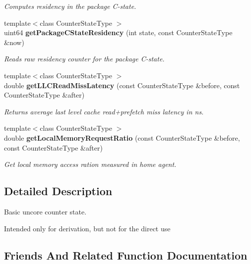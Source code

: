 \begin{DoxyCompactItemize}
\begin{DoxyCompactList}\small\item\em Computes residency in the package C-\/state. \end{DoxyCompactList}\item 
{\footnotesize template$<$class Counter\+State\+Type $>$ }\\uint64 \textbf{ get\+Package\+C\+State\+Residency} (int state, const Counter\+State\+Type \&now)
\begin{DoxyCompactList}\small\item\em Reads raw residency counter for the package C-\/state. \end{DoxyCompactList}\item 
\mbox{\label{classUncoreCounterState_a6791e3fe842320171cbac393e55929f6}} 
{\footnotesize template$<$class Counter\+State\+Type $>$ }\\double \textbf{ get\+L\+L\+C\+Read\+Miss\+Latency} (const Counter\+State\+Type \&before, const Counter\+State\+Type \&after)
\begin{DoxyCompactList}\small\item\em Returns average last level cache read+prefetch miss latency in ns. \end{DoxyCompactList}\item 
{\footnotesize template$<$class Counter\+State\+Type $>$ }\\double \textbf{ get\+Local\+Memory\+Request\+Ratio} (const Counter\+State\+Type \&before, const Counter\+State\+Type \&after)
\begin{DoxyCompactList}\small\item\em Get local memory access ration measured in home agent. \end{DoxyCompactList}\end{DoxyCompactItemize}


\subsection{Detailed Description}
Basic uncore counter state. 

Intended only for derivation, but not for the direct use 

\subsection{Friends And Related Function Documentation}
\mbox{\label{classUncoreCounterState_a8a7e839f24a02691d4b3509fc2adee51}} 
